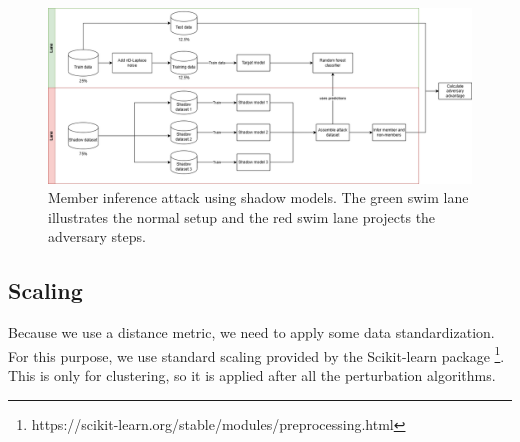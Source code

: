 \begin{figure}
  \includegraphics[width=1.2\textwidth]{Method/images/MI-setup.png}
  \caption{Member inference attack using shadow models. The green swim lane illustrates the normal setup and the red swim lane projects the adversary steps.}
  \label{figure:mi-attack}
\end{figure}
\newpage
\subsection{Scaling}
Because we use a distance metric, we need to apply some data standardization.
For this purpose, we use standard scaling provided by the Scikit-learn package \footnote{https://scikit-learn.org/stable/modules/preprocessing.html}.
This is only for clustering, so it is applied after all the perturbation algorithms.
